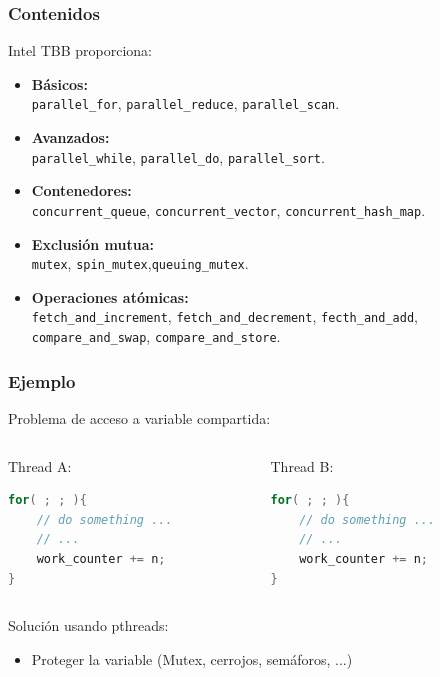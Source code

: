 \documentclass[10pt]{beamer}
\begin{document}
\begin{frame}
  \frametitle{Contenidos}
  Intel TBB proporciona:
  \begin{itemize}
  \item \textbf{Básicos:}\\\quad\texttt{parallel\_for}, \texttt{parallel\_reduce},
    \texttt{parallel\_scan}.
  \item \textbf{Avanzados:}\\\quad\texttt{parallel\_while}, \texttt{parallel\_do},
    \texttt{parallel\_sort}.
  \item \textbf{Contenedores:}\\\quad\texttt{concurrent\_queue},
    \texttt{concurrent\_vector}, \texttt{concurrent\_hash\_map}.
  \item \textbf{Exclusión mutua:}\\\quad\texttt{mutex},
    \texttt{spin\_mutex},\texttt{queuing\_mutex}.
  \item \textbf{Operaciones atómicas:}\\\quad
    \texttt{fetch\_and\_increment}, \texttt{fetch\_and\_decrement},
    \texttt{fecth\_and\_add}, \texttt{compare\_and\_swap},
    \texttt{compare\_and\_store}.
  \end{itemize}

\end{frame}



\begin{frame}[fragile] %
  \frametitle{Ejemplo}
  \alert{Problema} de acceso a variable compartida:
  \begin{columns}
    \begin{column}{0.45\textwidth}
      \center Thread A:
      \begin{lstlisting}[language=C++, frame=single]
for( ; ; ){
    // do something ...
    // ...
    work_counter += n;
}
      \end{lstlisting}
    \end{column}
    \begin{column}{0.45\textwidth}
      \center Thread B:
      \begin{lstlisting}[language=C++, frame=single]
for( ; ; ){
    // do something ...
    // ...
    work_counter += n;
}
      \end{lstlisting}
    \end{column}
  \end{columns}
  \alert{Solución} usando pthreads:
  \begin{itemize}
  \item Proteger la variable (Mutex, cerrojos, semáforos, ...)
  \end{itemize}
\end{frame}
\end{document}
